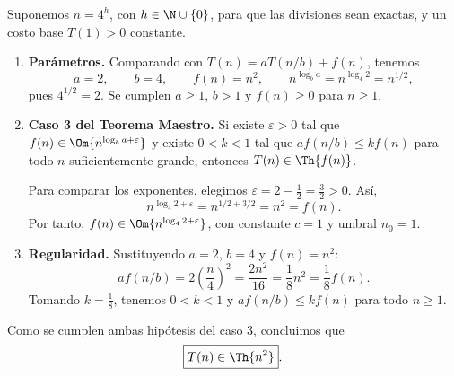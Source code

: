
Suponemos $n=4^h$, con $h\in\N\cup\{0\}$, para que las divisiones sean exactas, y un costo base $T(1)>0$ constante.

\begin{enumerate}
\item \textbf{Parámetros.} Comparando con $T(n)=aT(n/b)+f(n)$, tenemos
\[
a=2,\qquad b=4,\qquad f(n)=n^2,\qquad
n^{\log_b a}=n^{\log_4 2}=n^{1/2},
\]
pues $4^{1/2}=2$. Se cumplen $a\ge1$, $b>1$ y $f(n)\ge0$ para $n\ge1$.

\item \textbf{Caso 3 del Teorema Maestro.} Si existe $\varepsilon>0$ tal que
$f(n)\in\Om{n^{\log_b a+\varepsilon}}$ y existe $0<k<1$ tal que
$a f(n/b)\le kf(n)$ para todo $n$ suficientemente grande, entonces
$T(n)\in\Th{f(n)}$.

Para comparar los exponentes, elegimos $\varepsilon=2-\frac12=\frac32>0$. Así,
\[
n^{\log_4 2+\varepsilon}
=n^{1/2+3/2}
=n^2=f(n).
\]
Por tanto, $f(n)\in\Om{n^{\log_4 2+\varepsilon}}$, con constante $c=1$ y umbral $n_0=1$.

\item \textbf{Regularidad.} Sustituyendo $a=2$, $b=4$ y $f(n)=n^2$:
\[
a f(n/b)=2\left(\frac n4\right)^2
=\frac{2n^2}{16}
=\frac18 n^2
=\frac18 f(n).
\]
Tomando $k=\frac18$, tenemos $0<k<1$ y $a f(n/b)\le kf(n)$ para todo $n\ge1$.
\end{enumerate}

Como se cumplen ambas hipótesis del caso 3, concluimos que
\[
\boxed{T(n)\in\Th{n^2}}.
\]
\fin
